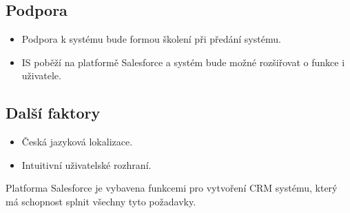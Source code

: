\subsection{Podpora}
\begin{itemize}
   \item Podpora k systému bude formou školení při předání systému.
   \item IS poběží na platformě Salesforce a systém bude možné rozšiřovat o funkce i uživatele.
\end{itemize}
\subsection{Další faktory}
\begin{itemize}
    \item Česká jazyková lokalizace.
    \item Intuitivní uživatelské rozhraní.
\end{itemize}
Platforma Salesforce je vybavena funkcemi pro vytvoření CRM systému, který má schopnost splnit všechny tyto požadavky.